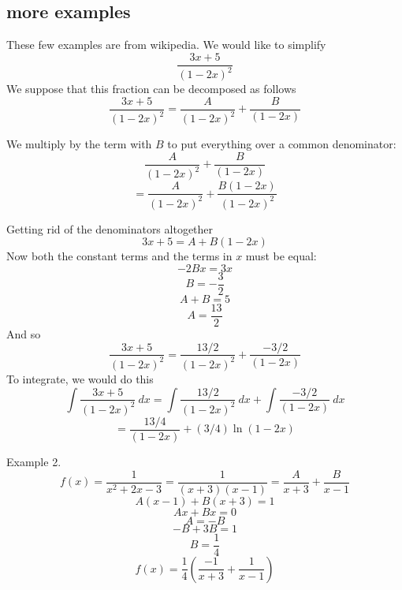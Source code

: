 \documentclass[11pt, oneside]{article}
\begin{document}
\subsection*{more examples}
These few examples are from wikipedia.  We would like to simplify
\[ \frac{3x+5}{(1-2x)^2} \]
 We suppose that this fraction can be decomposed as follows
\[ \frac{3x+5}{(1-2x)^2} = \frac{A}{(1-2x)^2} + \frac{B}{(1-2x)} \]

We multiply by the term with $B$ to put everything over a common denominator:
\[ \frac{A}{(1-2x)^2} + \frac{B}{(1-2x)} \]
\[ = \frac{A}{(1-2x)^2} + \frac{B(1-2x)}{(1-2x)^2}\]

Getting rid of the denominators altogether
\[ 3x + 5 = A + B(1-2x) \]
Now both the constant terms and the terms in $x$ must be equal:
\[ -2Bx = 3x \]
\[ B = -\frac{3}{2} \]
\[ A + B = 5 \]
\[ A = \frac{13}{2} \]
And so
\[ \frac{3x+5}{(1-2x)^2} = \frac{13/2}{(1-2x)^2} + \frac{-3/2}{(1-2x)} \]
To integrate, we would do this
\[ \int \frac{3x+5}{(1-2x)^2} \ dx = \int \frac{13/2}{(1-2x)^2} \ dx + \int \frac{-3/2}{(1-2x)}  \ dx \]
\[ = \frac{13/4}{(1-2x)} +(3/4) \ln (1-2x) \]

Example 2.
\[ f(x) = \frac{1}{x^2 + 2x - 3} = \frac{1}{(x+3)(x-1)} = \frac{A}{x+3} + \frac{B}{x-1} \]
\[ A(x-1) + B(x+3) = 1 \]
\[ Ax + Bx = 0 \]
\[ A = -B \]
\[ -B + 3B = 1 \]
\[ B = \frac{1}{4} \]
\[ f(x) = \frac{1}{4}( \frac{-1}{x+3} + \frac{1}{x-1} )\]
\end{document}
